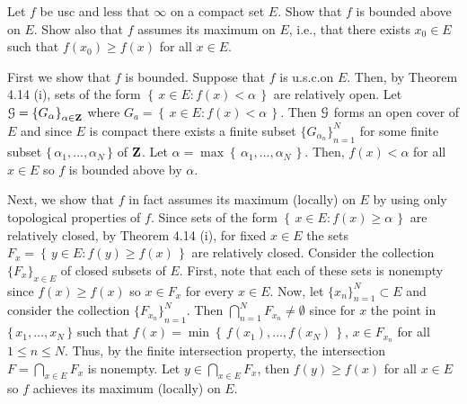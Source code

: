 \begin{problem}
  Let $f$ be usc and less that $\infty$ on a compact set $E$. Show that $f$
  is bounded above on $E$. Show also that $f$ assumes its maximum on $E$,
  i.e., that there exists $x_0\in E$ such that $f(x_0)\geq f(x)$ for all
  $x\in E$.
\end{problem}
\begin{solution}
  First we show that $f$ is bounded. Suppose that $f$ is u.s.c.\@ on
  $E$. Then, by Theorem 4.14 (i), sets of the form
  $\left\{\,x\in E:f(x)<\alpha\,\right\}$ are relatively open. Let
  $\mathcal{G}={\{G_\alpha\}}_{\alpha\in\mathbf{Z}}$ where
  $G_a=\left\{\,x\in E:f(x)<\alpha\,\right\}$. Then $\mathcal{G}$ forms an open
  cover of $E$ and since $E$ is compact there exists a finite subset
  ${\{G_{\alpha_n}\}}_{n=1}^N$ for some finite subset
  $\{\,\alpha_1,\ldots,\alpha_N\,\}$ of $\mathbf{Z}$. Let
  $\alpha=\max\left\{\,\alpha_1,\ldots,\alpha_N\,\right\}$. Then,
  $f(x)<\alpha$ for all $x\in E$ so $f$ is bounded above by $\alpha$.

  Next, we show that $f$ in fact assumes its maximum (locally) on $E$ by
  using only topological properties of $f$. Since sets of the form
  $\left\{\,x\in E:f(x)\geq\alpha\,\right\}$ are relatively closed, by
  Theorem 4.14 (i), for fixed $x\in E$ the sets
  $F_x=\left\{\,y\in E:f(y)\geq f(x)\,\right\}$ are relatively
  closed. Consider the collection ${\{F_x\}}_{x\in E}$ of closed subsets of
  $E$. First, note that each of these sets is nonempty since
  $f(x)\geq f(x)$ so $x\in F_x$ for every $x\in E$. Now, let
  ${\{x_n\}}_{n=1}^N\subset E$ and consider the collection
  ${\{F_{x_n}\}}_{n=1}^N$. Then $\bigcap_{n=1}^N F_{x_n}\neq\emptyset$
  since for $x$ the point in $\{\,x_1,\ldots,x_N\,\}$ such that
  $f(x)=\min\left\{\,f(x_1),\ldots,f(x_N)\,\right\}$, $x\in F_{x_n}$ for
  all $1\leq n\leq N$. Thus, by the finite intersection property, the
  intersection $F=\bigcap_{x\in E}F_x$ is nonempty. Let
  $y\in\bigcap_{x\in E} F_x$, then $f(y)\geq f(x)$ for all $x\in E$ so $f$
  achieves its maximum (locally) on $E$.
\end{solution}

